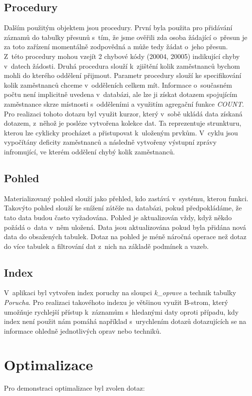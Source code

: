 \documentclass[11pt,a4paper,onecolumn]{article}
\begin{document}
\subsection{Procedury}
Dalším použitým objektem jsou procedury. První byla použita pro přidávání záznamů do tabulky přesunů s~tím, že jsme ověřili zda osoba žádající o~přesun je za toto zařízení momentálně zodpovědná a může tedy žádat o~jeho přesun. Z~této procedury mohou vzejít 2 chybové kódy (20004, 20005) indikující chyby v~datech žádosti. Druhá procedura slouží k~zjištění kolik zaměstnanců bychom mohli do kterého oddělení přijmout. Parametr procedury slouží ke specifikování kolik zaměstnanců chceme v~odděleních celkem mít. Informace o~současném počtu není implicitně uvedena v~databázi, ale lze ji získat dotazem spojujícím zaměstnance skrze místnosti s~odděleními a využitím agregační funkce \textit{COUNT}. Pro realizaci tohoto dotazu byl využit kurzor, který v~sobě ukládá data získaná dotazem, z~něhož je posléze vytvořena kolekce dat. Ta reprezentuje strunkturu, kterou lze cyklicky procházet a přistupovat k~uloženým prvkům. V~cyklu jsou vypočítány deficity zaměstnanců a následně vytvořeny výstupní zprávy infromující, ve kterém oddělení chybý kolik zaměstnanců.
\subsection{Pohled}
Materializovaný pohled slouží jako přehled, kdo zastává v~systému, kterou funkci. Takovýto pohled slouží ke snížení zátěže na databázi, pokud předpokládáme, že tato data budou často vyžadována. Pohled je aktualizován vždy, když někdo požádá o~data v~něm uložená. Data jsou aktualizována pokud byla přidána nová data do obsažených tabulek. Dotaz na pohled je méně náročná operace než dotaz do více tabulek a filtrování dat z~nich na základě podmínek a vazeb.\newpage
\subsection{Index}
V~aplikaci byl vytvořen index poruchy na sloupci \textit{k\_oprave} a technik tabulky \textit{Porucha}. Pro realizaci takovéhoto indexu je většinou využit B-strom, který umožňuje rychlejší přístup k~záznamům s~hledanými daty oproti případu, kdy index není použit nám pomáhá například s~urychlením dotazů dotazujících se na informace ohledně jednotlivých oprav nebo techniků.
\section{Optimalizace}
Pro demonstraci optimalizace byl zvolen dotaz:
\end{document}

